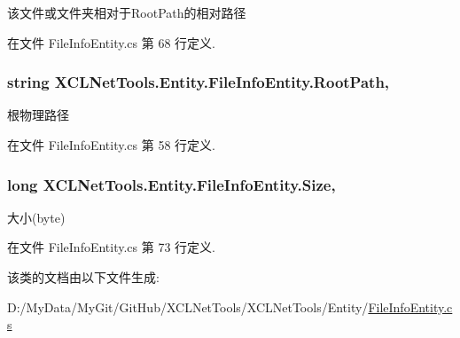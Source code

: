 该文件或文件夹相对于\-Root\-Path的相对路径 



在文件 File\-Info\-Entity.\-cs 第 68 行定义.

\hypertarget{class_x_c_l_net_tools_1_1_entity_1_1_file_info_entity_a6ef4c659747c605379a43168ae1d64f6}{
\subsubsection[{Root\-Path}]{\setlength{\rightskip}{0pt plus 5cm}string X\-C\-L\-Net\-Tools.\-Entity.\-File\-Info\-Entity.\-Root\-Path\hspace{0.3cm}{\ttfamily [get]}, {\ttfamily [set]}}}\label{class_x_c_l_net_tools_1_1_entity_1_1_file_info_entity_a6ef4c659747c605379a43168ae1d64f6}


根物理路径 



在文件 File\-Info\-Entity.\-cs 第 58 行定义.

\hypertarget{class_x_c_l_net_tools_1_1_entity_1_1_file_info_entity_a7447a43994e75793388e160a626ba346}{
\subsubsection[{Size}]{\setlength{\rightskip}{0pt plus 5cm}long X\-C\-L\-Net\-Tools.\-Entity.\-File\-Info\-Entity.\-Size\hspace{0.3cm}{\ttfamily [get]}, {\ttfamily [set]}}}\label{class_x_c_l_net_tools_1_1_entity_1_1_file_info_entity_a7447a43994e75793388e160a626ba346}


大小(byte) 



在文件 File\-Info\-Entity.\-cs 第 73 行定义.



该类的文档由以下文件生成\-:\begin{DoxyCompactItemize}
\item 
D\-:/\-My\-Data/\-My\-Git/\-Git\-Hub/\-X\-C\-L\-Net\-Tools/\-X\-C\-L\-Net\-Tools/\-Entity/\hyperlink{_file_info_entity_8cs}{File\-Info\-Entity.\-cs}\end{DoxyCompactItemize}
